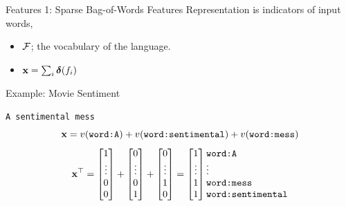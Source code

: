 \documentclass{beamer}
\begin{document}
\begin{frame}{Features 1: Sparse Bag-of-Words Features}
  Representation is indicators of input words, 
  \begin{itemize}
  \item $\mathcal{F}$; the vocabulary of the language.
  \item $\mathbf{x} = \sum_{i} \boldsymbol{\delta}(f_i)$ 
  \end{itemize}

  Example: Movie Sentiment
  \begin{center}
    \texttt{A sentimental mess}
    \[ \mathbf{x} = v(\texttt{word:A}) + v(\texttt{word:sentimental}) +
    v(\texttt{word:mess}) \] 
    \[ \boldx^\top =\begin{bmatrix} 1 \\ \vdots
        \\ 0\\ 0 \\ \end{bmatrix} +\begin{bmatrix} 0 \\
        \vdots \\ 0\\ 1 \\ \end{bmatrix} +
     \begin{bmatrix} 0 \\ \vdots \\ 1\\ 0 \\ \end{bmatrix} 
    =\begin{bmatrix} 1 \\ \vdots \\ 1 \\ 1 \\ \end{bmatrix} 
    \begin{matrix*}[l] \mathrm{\texttt{word:A}} \\ \vdots \\ \mathrm{\texttt{word:mess}} \\ \mathrm{\texttt{word:sentimental}} \\ \end{matrix*}
     \]
  \end{center}
\end{frame}
\end{document}
